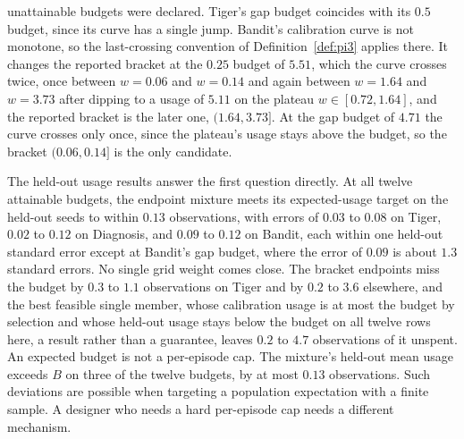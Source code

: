 unattainable budgets were declared. Tiger's gap budget coincides with its $0.5$ budget, since its curve has a single jump. Bandit's calibration curve is not monotone, so the last-crossing convention of Definition~\ref{def:pi3} applies there. It changes the reported bracket at the $0.25$ budget of $5.51$, which the curve crosses twice, once between $w{=}0.06$ and $w{=}0.14$ and again between $w{=}1.64$ and $w{=}3.73$ after dipping to a usage of $5.11$ on the plateau $w \in [0.72, 1.64]$, and the reported bracket is the later one, $(1.64, 3.73]$. At the gap budget of $4.71$ the curve crosses only once, since the plateau's usage stays above the budget, so the bracket $(0.06, 0.14]$ is the only candidate.

The held-out usage results answer the first question directly. At all twelve attainable budgets, the endpoint mixture meets its expected-usage target on the held-out seeds to within $0.13$ observations, with errors of $0.03$ to $0.08$ on Tiger, $0.02$ to $0.12$ on Diagnosis, and $0.09$ to $0.12$ on Bandit, each within one held-out standard error except at Bandit's gap budget, where the error of $0.09$ is about $1.3$ standard errors. No single grid weight comes close. The bracket endpoints miss the budget by $0.3$ to $1.1$ observations on Tiger and by $0.2$ to $3.6$ elsewhere, and the best feasible single member, whose calibration usage is at most the budget by selection and whose held-out usage stays below the budget on all twelve rows here, a result rather than a guarantee, leaves $0.2$ to $4.7$ observations of it unspent. An expected budget is not a per-episode cap. The mixture's held-out mean usage exceeds $B$ on three of the twelve budgets, by at most $0.13$ observations. Such deviations are possible when targeting a population expectation with a finite sample. A designer who needs a hard per-episode cap needs a different mechanism.

